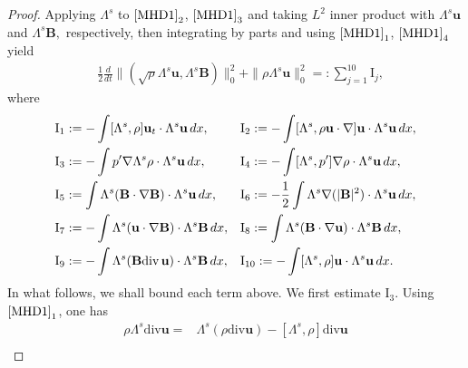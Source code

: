 \documentclass[12pt, reqno]{amsart}
\numberwithin{equation}{section}
\numberwithin{equation}{section}
\def\div{ \hbox{\rm div}\,  }
\numberwithin{equation}{section}
\numberwithin{equation}{section}
\theoremstyle{remark}
\def\div{ \hbox{\rm div}\,  }
\def\u{ \mathbf{u} }
\def\b{ \mathbf{B} }
\begin{document}
\begin{proof} %
Applying $\Lambda^s$ %
to $\eqref{MHD1}_{2}$, $\eqref{MHD1}_{3}$ and taking $L^2$ inner product with $\Lambda^s\u$ and $\Lambda^s \b,$ respectively,  then integrating by parts and using $\eqref{MHD1}_{1}$, $\eqref{MHD1}_{4}$ yield
\begin{equation}\begin{split}\label{pri-4}
&\frac12\frac{d}{dt}\|(\sqrt\rho\Lambda^s\u,\Lambda^s\b)\|^2_0+\|\rho\Lambda^{s}\u\|_0^2
=:\sum_{j=1}^{10}\textrm{I}_j,
\end{split}\end{equation}
where
\begin{align*}
  &\textrm{I}_1:=-\int[\Lambda^s,\rho]\u_t\cdot \Lambda^s\u \,dx,&&\textrm{I}_2:=-\int[\Lambda^s,\rho \u\cdot\nabla]\u\cdot \Lambda^s\u \,dx,\\
   &\textrm{I}_3:=-\int p'\nabla\Lambda^s\rho\cdot \Lambda^s\u \,dx,&&\textrm{I}_4:=-\int [\Lambda^s,p']\nabla\rho\cdot\Lambda^s \u \,dx,\\
   &\textrm{I}_5:=\int \Lambda^s(\b\cdot\nabla \b)\cdot\Lambda^s \u \,dx,&&\textrm{I}_6:= -\frac12\int \Lambda^s\nabla(|\b|^2)\cdot\Lambda^s \u \,dx,\\
   &\textrm{I}_7:=-\int\Lambda^s(\u\cdot\nabla \b)\cdot\Lambda^s\b \,dx,&&\textrm{I}_8:=\int\Lambda^s(\b\cdot\nabla \u)\cdot\Lambda^s\b \,dx,\\ &\textrm{I}_9:=-\int\Lambda^s(\b\div \u)\cdot\Lambda^s \b \,dx,&&\textrm{I}_{10}:=-\int[\Lambda^s,\rho]\u\cdot\Lambda^s \u \,dx.
\end{align*}
In what follows, we shall bound each term above.  We first estimate $\textrm{I}_3$.
Using $\eqref{MHD1}_{1}$, one has
\begin{align*}
  \rho\Lambda^s\text{div}\u=&\Lambda^s(\rho\text{div}\u)-[\Lambda^s,\rho]\text{div}\u\\

\end{align*}
\end{proof}
\end{document}

